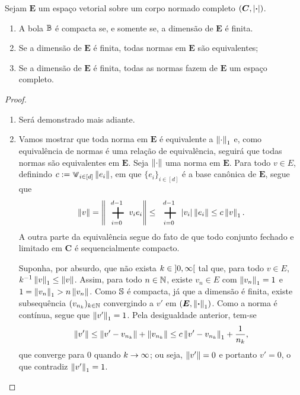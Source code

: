 \begin{proposition}
Sejam $\bm E$ um espaço vetorial sobre um corpo normado completo $(\bm C,\abs{\var})$.
	\begin{enumerate}
	\item A bola $\B$ é compacta se, e somente se, a dimensão de $\bm E$ é finita.
	\item Se a dimensão de $\bm E$ é finita, todas normas em $\bm E$ são equivalentes;
	\item Se a dimensão de $\bm E$ é finita, todas as normas fazem de $\bm E$ um espaço completo. 
	\end{enumerate}
\end{proposition}
\begin{proof}
	\begin{enumerate}
	\item Será demonstrado mais adiante.
	
	\item Vamos mostrar que toda norma em $\bm E$ é equivalente a $\nor{\cdot}_1$ e, como equivalência de normas é uma relação de equivalência, seguirá que todas normas são equivalentes em $\bm E$. Seja $\nor{\cdot}$ uma norma em $\bm E$. Para todo $v \in E$, definindo $c := \max_{i \in [d]} \nor{e_i}$, em que $\{e_i\}_{i \in [d]}$ é a base canônica de $\bm E$, segue que
	\begin{equation*}
	\nor{v} = \nor{\sum_{i=0}^{d-1} v_ie_i} \leq \sum_{i=0}^{d-1}\abs{v_i}\nor{e_i} \leq c\nor{v}_1.
	\end{equation*}
A outra parte da equivalência segue do fato de que todo conjunto fechado e limitado em $\bm C$ é sequencialmente compacto.

Suponha, por absurdo, que não exista $k \in \intaa{0}{\infty}$ tal que, para todo $v \in E$, $k\inv\nor{v}_1 \leq \nor{v}$. Assim, para todo $n \in \N$, existe $v_n \in E$ com $\nor{v_n}_1 = 1$ e $1 = \nor{v_n}_1 > n\nor{v_n}$. Como $\S$ é compacta, já que a dimensão é finita, existe subsequência $(v_{n_k})_{k \in \N}$ convergindo a $v'$ em $(\bm E,\nor{\var}_1)$. Como a norma é contínua, segue que $\nor{v'}_1 = 1$. Pela desigualdade anterior, tem-se
	\begin{equation*}
	\nor{v'} \leq \nor{v' - v_{n_k}} + \nor{v_{n_k}} \leq c\nor{v' - v_{n_k}}_1 + \frac{1}{n_k},
	\end{equation*}
que converge para $0$ quando $k \conv \infty$; ou seja, $\nor{v'}=0$ e portanto $v'=0$, o que contradiz $\nor{v'}_1=1$.


\end{enumerate}
\end{proof}
